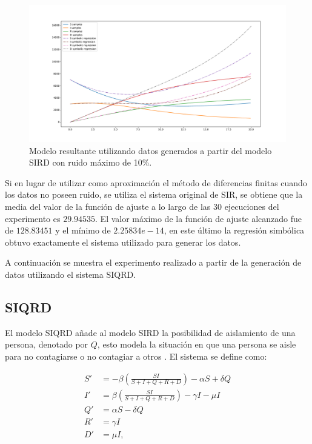 \begin{figure}[h]
    \centering
    \includegraphics[width=\textwidth]{"figures/final_plot_SIRD_0.1.pdf"}
    \caption{Modelo resultante utilizando datos generados a partir del modelo SIRD con ruido máximo de 10\%.}
    \label{fig:final_plot_SIRD_0.1}
\end{figure}

Si en lugar de utilizar como aproximación el método de diferencias finitas cuando los datos no poseen ruido, se utiliza el sistema original de SIR, se obtiene que la media del valor de la función de ajuste a lo largo de las 30 ejecuciones del experimento es $29.94535$. El valor máximo de la función de ajuste alcanzado fue de $128.83451$ y el mínimo de $2.25834e-14$, en este último la regresión simbólica obtuvo exactamente el sistema utilizado para generar los datos.

A continuación se muestra el experimento realizado a partir de la generación de datos utilizando el sistema SIQRD.

\subsection{SIQRD}

El modelo SIQRD añade al modelo SIRD la posibilidad de aislamiento de una persona, denotado por $Q$, esto modela la situación en que una persona se aisle para no contagiarse o no contagiar a otros \cite{molter2021mathematical}. El sistema se define como:

\begin{align*}
    S' & = -\beta (\frac{S I}{S + I + Q + R + D}) - \alpha S + \delta Q \\
    I' & = \beta (\frac{S I}{S + I + Q + R + D}) - \gamma I - \mu I     \\
    Q' & = \alpha S - \delta Q                                          \\
    R' & = \gamma I                                                     \\
    D' & = \mu I,
\end{align*}

